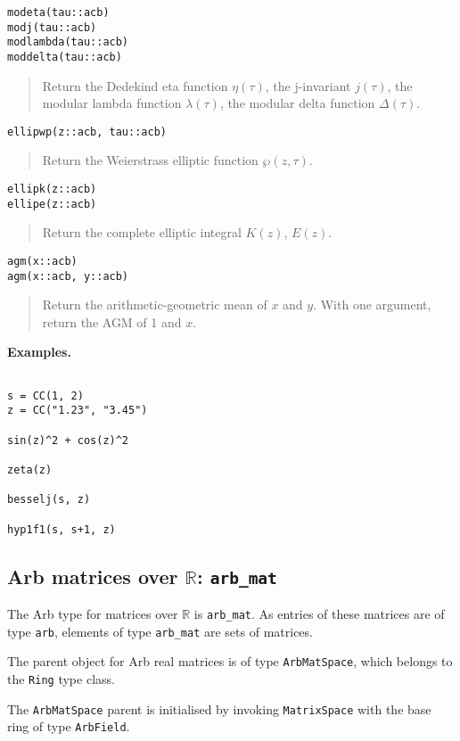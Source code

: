 \documentclass[a4paper,10pt]{article}
\newcommand{\R}{\mathbb{R}}
\newcommand{\code}{\lstinline}
\newcommand{\desc}[1]{\vspace{-3mm}\begin{quote}#1\end{quote}}
\begin{document}
{{\begin{lstlisting}
modeta(tau::acb)
modj(tau::acb)
modlambda(tau::acb)
moddelta(tau::acb)
\end{lstlisting}

\desc{Return the Dedekind eta function $\eta(\tau)$, the j-invariant $j(\tau)$,
the modular lambda function $\lambda(\tau)$, the modular delta function $\Delta(\tau)$.}

\begin{lstlisting}
ellipwp(z::acb, tau::acb)
\end{lstlisting}

\desc{Return the Weierstrass elliptic function $\wp(z,\tau)$.}

\begin{lstlisting}
ellipk(z::acb)
ellipe(z::acb)
\end{lstlisting}

\desc{Return the complete elliptic integral $K(z)$, $E(z)$.}

\begin{lstlisting}
agm(x::acb)
agm(x::acb, y::acb)
\end{lstlisting}

\desc{Return the arithmetic-geometric mean of $x$ and $y$. With one argument,
return the AGM of 1 and $x$.}

\textbf{Examples.}

\begin{lstlisting}

s = CC(1, 2)
z = CC("1.23", "3.45")

sin(z)^2 + cos(z)^2

zeta(z)

besselj(s, z)

hyp1f1(s, s+1, z)

\end{lstlisting}

\subsection{Arb matrices over $\R$: \code|arb_mat|}

The Arb type for matrices over $\R$ is \code{arb_mat}.
As entries of these matrices are of type \code{arb}, elements of type \code{arb_mat}
are sets of matrices.

The parent object for Arb real matrices is of type \code{ArbMatSpace}, which
belongs to the \code{Ring} type class.

The \code{ArbMatSpace} parent is initialised by invoking \code{MatrixSpace}
with the base ring of type \code{ArbField}.

}}
\end{document}
